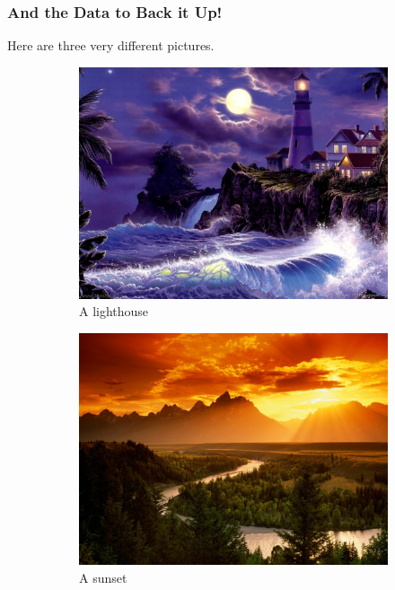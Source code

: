 \documentclass{beamer}
\begin{document}
\begin{frame}\frametitle{And the Data to Back it Up!}
Here are three very different pictures.
\begin{figure}[h]
\begin{subfigure}[t]{0.3\textwidth}
\includegraphics[scale=.1]{lighthouse.jpg}
\caption{A lighthouse}
\end{subfigure}
\begin{subfigure}[t]{0.3\textwidth}
\includegraphics[scale=.1]{sunset.jpg}
\caption{A sunset}
\end{subfigure}
\begin{subfigure}[t]{0.3\textwidth}

\end{subfigure}
\end{figure}
\end{frame}
\end{document}
